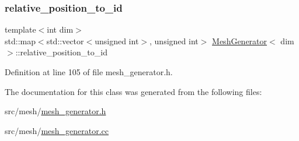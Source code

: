 \subsubsection{\texorpdfstring{relative\+\_\+position\+\_\+to\+\_\+id}{relative\_position\_to\_id}}
{\footnotesize\ttfamily template$<$int dim$>$ \\
std\+::map$<$std\+::vector$<$unsigned int$>$, unsigned int$>$ \hyperlink{class_mesh_generator}{Mesh\+Generator}$<$ dim $>$\+::relative\+\_\+position\+\_\+to\+\_\+id\hspace{0.3cm}{\ttfamily [private]}}



Definition at line 105 of file mesh\+\_\+generator.\+h.



The documentation for this class was generated from the following files\+:\begin{DoxyCompactItemize}
\item 
src/mesh/\hyperlink{mesh__generator_8h}{mesh\+\_\+generator.\+h}\item 
src/mesh/\hyperlink{mesh__generator_8cc}{mesh\+\_\+generator.\+cc}\end{DoxyCompactItemize}
